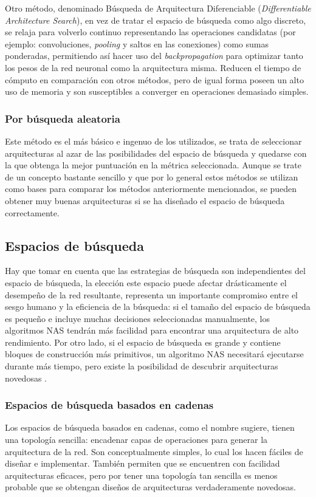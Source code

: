 Otro método, denominado Búsqueda de Arquitectura Diferenciable (\textit{Differentiable Architecture Search}), en vez de tratar el espacio de búsqueda como algo discreto, se relaja para volverlo continuo representando las operaciones candidatas (por ejemplo: convoluciones, \textit{pooling} y saltos en las conexiones) como sumas ponderadas, permitiendo así hacer uso del \textit{backpropagation} para optimizar tanto los pesos de la red neuronal como la arquitectura misma. Reducen el tiempo de cómputo en comparación con otros métodos, pero de igual forma poseen un alto uso de memoria y son susceptibles a converger en operaciones demasiado simples.

\subsubsection{Por búsqueda aleatoria}
Este método es el más básico e ingenuo de los utilizados, se trata de seleccionar arquitecturas al azar de las posibilidades del espacio de búsqueda y quedarse con la que obtenga la mejor puntuación en la métrica seleccionada. Aunque se trate de un concepto bastante sencillo y que por lo general estos métodos se utilizan como bases para comparar los métodos anteriormente mencionados, se pueden obtener muy buenas arquitecturas si se ha diseñado el espacio de búsqueda correctamente.

\subsection{Espacios de búsqueda}
Hay que tomar en cuenta que las estrategias de búsqueda son independientes del espacio de búsqueda, la elección este espacio puede afectar drásticamente el desempeño de la red resultante, representa un importante compromiso entre el sesgo humano y la eficiencia de la búsqueda: si el tamaño del espacio de búsqueda es pequeño e incluye muchas decisiones seleccionadas manualmente, los algoritmos NAS tendrán más facilidad para encontrar una arquitectura de alto rendimiento. Por otro lado, si el espacio de búsqueda es grande y contiene bloques de construcción más primitivos, un algoritmo NAS necesitará ejecutarse durante más tiempo, pero existe la posibilidad de descubrir arquitecturas novedosas \cite{white_neural_2023}.

\subsubsection{Espacios de búsqueda basados en cadenas}
Los espacios de búsqueda basados en cadenas, como el nombre sugiere, tienen una topología sencilla: encadenar capas de operaciones para generar la arquitectura de la red. Son conceptualmente simples, lo cual los hacen fáciles de diseñar e implementar. También permiten que se encuentren con facilidad arquitecturas eficaces, pero por tener una topología tan sencilla es menos probable que se obtengan diseños de arquitecturas verdaderamente novedosas.

